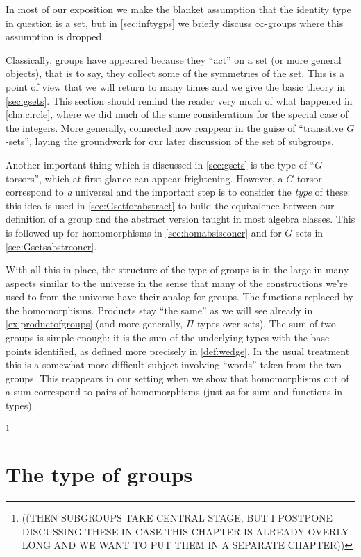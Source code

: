 In most of our exposition we make the blanket assumption that the identity type in question is a set, but in \cref{sec:inftygps} we briefly discuss $\infty$-groups where this assumption is dropped.

Classically, groups have appeared because they ``act'' on a set (or more general objects), that is to say, they collect some of the symmetries of the set.  This is a point of view that we will return to many times and we give the basic theory in \cref{sec:gsets}.  
This section should remind the reader very much of what happened in \cref{cha:circle}, where we did much of the same considerations for the special case of the integers.  
More generally, connected \coverings now reappear in the guise of ``transitive $G$-sets'', laying the groundwork for our later discussion of the set of subgroups.  

Another important thing which is discussed in \cref{sec:gsets} is the type of ``$G$-torsors'', which at first glance can appear frightening.  
However, a $G$-torsor correspond to \emph{a} universal \covering and the important step is to consider the \emph{type} of these: this idea is used in \cref{sec:Gsetforabstract} to build the equivalence between our definition of a group and the abstract version taught in most algebra classes.  This is followed up for homomorphisms in \cref{sec:homabsisconcr} and for $G$-sets in \cref{sec:Gsetsabstrconcr}.

With all this in place, the structure of the type of groups is in the large in many aspects similar to the universe in the sense that many of the constructions we're used to from the universe have their analog for groups.  The functions replaced by the homomorphisms.  
Products stay ``the same'' as we will see already in \cref{ex:productofgroups} (and more generally, $\Pi$-types over sets).  
The sum of two groups is simple enough: it is the sum of the underlying types with the base points identified, as defined more precisely in \cref{def:wedge}.  
In the usual treatment this is a somewhat more difficult subject involving ``words'' taken from the two groups.  This reappears in our setting when we show that homomorphisms out of a sum correspond to pairs of homomorphisms (just as for sum and functions in types).

\footnote{((THEN SUBGROUPS TAKE CENTRAL STAGE, BUT I POSTPONE DISCUSSING THESE IN CASE THIS CHAPTER IS ALREADY OVERLY LONG AND WE WANT TO PUT THEM IN A SEPARATE CHAPTER))}

   

\section{The type of groups}
\label{sec:typegroup}

